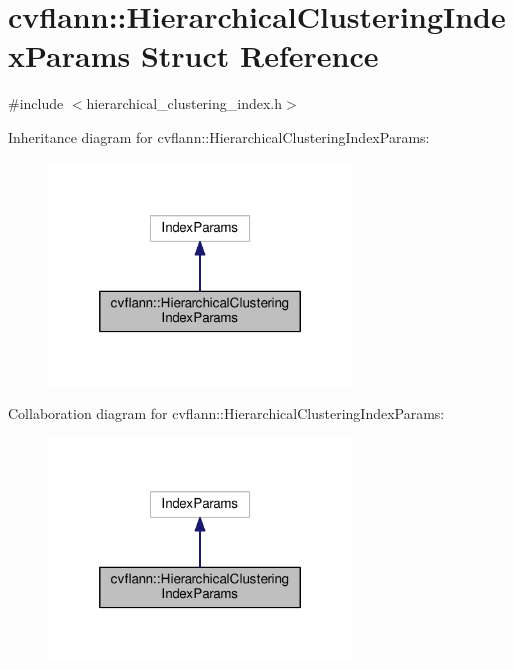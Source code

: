 \hypertarget{structcvflann_1_1HierarchicalClusteringIndexParams}{\section{cvflann\-:\-:Hierarchical\-Clustering\-Index\-Params Struct Reference}
\label{structcvflann_1_1HierarchicalClusteringIndexParams}
}


{\ttfamily \#include $<$hierarchical\-\_\-clustering\-\_\-index.\-h$>$}



Inheritance diagram for cvflann\-:\-:Hierarchical\-Clustering\-Index\-Params\-:\nopagebreak
\begin{figure}[H]
\begin{center}
\leavevmode
\includegraphics[width=228pt]{structcvflann_1_1HierarchicalClusteringIndexParams__inherit__graph}
\end{center}
\end{figure}


Collaboration diagram for cvflann\-:\-:Hierarchical\-Clustering\-Index\-Params\-:\nopagebreak
\begin{figure}[H]
\begin{center}
\leavevmode
\includegraphics[width=228pt]{structcvflann_1_1HierarchicalClusteringIndexParams__coll__graph}
\end{center}
\end{figure}
